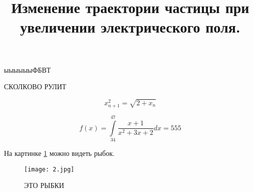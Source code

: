 \documentclass[12pt]{article}
\title{Изменение траектории частицы при увеличении электрического поля.}
\author {}
\date{}
\begin{document}
ыыыыыыФБВТ

СКОЛКОВО РУЛИТ 

$$x_{n+1}^2 = \sqrt{2 + x_n}$$

$$f(x) = \int\limits_{34}^{47}\frac{x+1}{x^2 + 3x + 2}dx = 555$$

На картинке \ref{2__} можно видеть рыбок.

\begin{figure}[h]\center
{\texttt{[image: 2.jpg]}}
\caption{ЭТО РЫБКИ}

\label{2__}
\end{figure}
\end{document}
